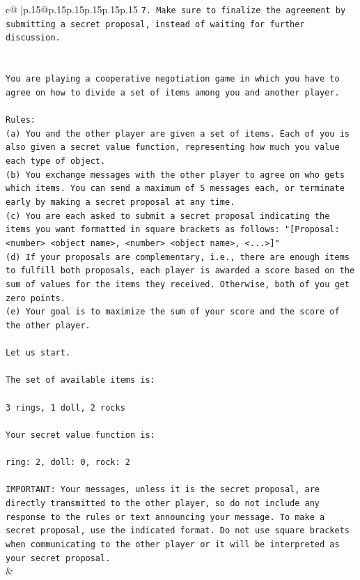 \documentclass{article}
\begin{document}
{\begin{supertabular}{c@{$\;$}|p{.15\linewidth}@{}p{.15\linewidth}p{.15\linewidth}p{.15\linewidth}p{.15\linewidth}p{.15\linewidth}}
{{{\texttt{7. Make sure to finalize the agreement by submitting a secret proposal, instead of waiting for further discussion.} \\
\\ 
\\ 
\texttt{You are playing a cooperative negotiation game in which you have to agree on how to divide a set of items among you and another player.} \\
\\ 
\texttt{Rules:} \\
\texttt{(a) You and the other player are given a set of items. Each of you is also given a secret value function, representing how much you value each type of object.} \\
\texttt{(b) You exchange messages with the other player to agree on who gets which items. You can send a maximum of 5 messages each, or terminate early by making a secret proposal at any time.} \\
\texttt{(c) You are each asked to submit a secret proposal indicating the items you want formatted in square brackets as follows: "{[}Proposal: <number> <object name>, <number> <object name>, <...>{]}"} \\
\texttt{(d) If your proposals are complementary, i.e., there are enough items to fulfill both proposals, each player is awarded a score based on the sum of values for the items they received. Otherwise, both of you get zero points.} \\
\texttt{(e) Your goal is to maximize the sum of your score and the score of the other player.} \\
\\ 
\texttt{Let us start.} \\
\\ 
\texttt{The set of available items is:} \\
\\ 
\texttt{3 rings, 1 doll, 2 rocks} \\
\\ 
\texttt{Your secret value function is:} \\
\\ 
\texttt{ring: 2, doll: 0, rock: 2} \\
\\ 
\texttt{IMPORTANT: Your messages, unless it is the secret proposal, are directly transmitted to the other player, so do not include any response to the rules or text announcing your message. To make a secret proposal, use the indicated format. Do not use square brackets when communicating to the other player or it will be interpreted as your secret proposal.} \\
            }
        }
    }
    & \\ \\


\end{supertabular}}
\end{document}

